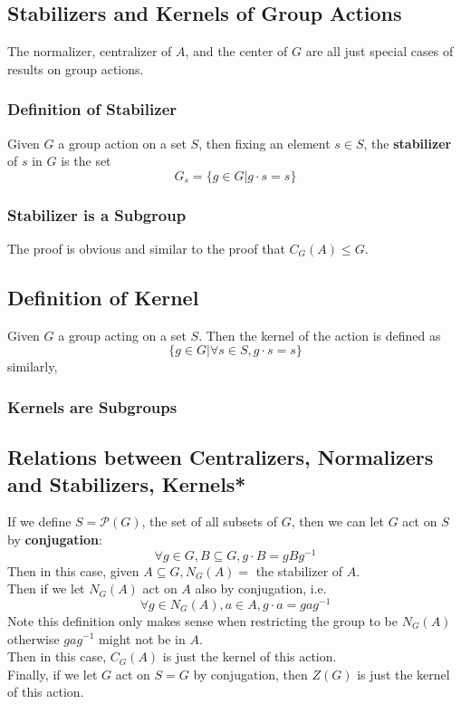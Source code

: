 \documentclass{article}
\begin{document}
\subsection*{Stabilizers and Kernels of Group Actions}
The normalizer, centralizer of $A$, and the center of $G$ are all just special cases of results on group actions.
\subsubsection*{Definition of Stabilizer}
Given $G$ a group action on a set $S$, then fixing an element $s \in S$, the \textbf{stabilizer} of $s$ in $G$ is the set
\begin{equation*}
    G_s = \{g \in G | g\cdot s = s\}
\end{equation*}
\subsubsection*{Stabilizer is a Subgroup}
The proof is obvious and similar to the proof that $C_G(A) \leq G$.
\subsection*{Definition of Kernel}
Given $G$ a group acting on a set $S$. Then the kernel of the action is defined as
\begin{equation*}
    \{g \in G| \forall s \in S, g\cdot s = s\}
\end{equation*}
similarly,
\subsubsection*{Kernels are Subgroups}
\subsection*{Relations between Centralizers, Normalizers and Stabilizers, Kernels*}
If we define $S = \mathcal{P}(G)$, the set of all subsets of $G$, then we can let $G$ act on $S$ by \textbf{conjugation}:
\begin{equation*}
    \forall g \in G, B \subseteq G, g\cdot B = gBg^{-1}
\end{equation*}
Then in this case, given $A \subseteq G, N_G(A) = $ the stabilizer of $A$.\\
Then if we let $N_G(A)$ act on $A$ also by conjugation, i.e.
\begin{equation*}
    \forall g \in N_G(A), a \in A, g\cdot a = gag^{-1}
\end{equation*}
Note this definition only makes sense when restricting the group to be $N_G(A)$ otherwise $gag^{-1}$ might not be in $A$.\\
Then in this case, $C_G(A)$ is just the kernel of this action.\\
Finally, if we let $G$ act on $S = G$ by conjugation, then $Z(G)$ is just the kernel of this action.
\end{document}

